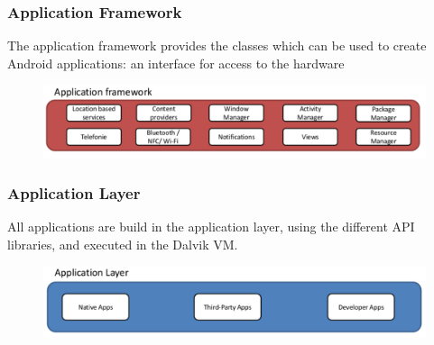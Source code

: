 \documentclass{beamer}
\begin{document}
\begin{frame}
\frametitle{Application Framework}
	The application framework provides the classes which can be used to create Android applications: an interface for access to the hardware 
	\begin{figure}[b]
	\centering
		\includegraphics[width=\textwidth]{img/appFramework.pdf}
	\label{fig:kernel}
\end{figure}
\end{frame}

\begin{frame}
\frametitle{Application Layer}
	All applications are build in the application layer, using the different API libraries, and executed in the Dalvik VM. 
	\begin{figure}[b]
	\centering
		\includegraphics[width=\textwidth]{img/apllicationLayer.pdf}
	\label{fig:kernel}
\end{figure}
\end{frame}


{
	\begin{frame}[plain]
	\end{frame}
}
\end{document}
